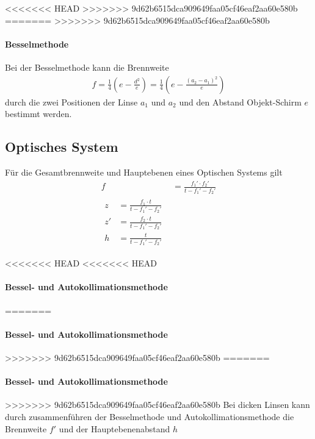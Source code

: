 \documentclass[11pt, a4paper]{article}
\begin{document}
<<<<<<< HEAD
>>>>>>> 9d62b6515dca909649faa05cf46eaf2aa60e580b
=======
>>>>>>> 9d62b6515dca909649faa05cf46eaf2aa60e580b
    \paragraph{Besselmethode}
    Bei der Besselmethode kann die Brennweite
    \begin{align}
        f = \frac{1}{4} \left( e - \frac{d^2}{e} \right) = \frac{1}{4} \left( e - \frac{\left(a_2 - a_1\right)^2}{e} \right) \label{eq:bessel}
    \end{align}
    durch die zwei Positionen der Linse $a_1$ und $a_2$ und den Abstand Objekt-Schirm $e$ bestimmt werden.
    
    \subsection{Optisches System}

    Für die Gesamtbrennweite und Hauptebenen eines Optischen Systems gilt
    \begin{align}
        f &= \frac{f_1' \cdot f_2'}{t - f_1' - f_2'} \label{eq:brenn}\\ 
        \begin{split} \label{eq:ebene}
           z &= \frac{f_1 \cdot t}{t - f_1' - f_2'}  \\
           z' &= \frac{f_2 \cdot t}{t - f_1' - f_2'} \\
           h &= \frac{t}{t - f_1' - f_2'}
        \end{split}
    \end{align}

<<<<<<< HEAD
<<<<<<< HEAD
    \paragraph*{Bessel- und Autokollimationsmethode}
=======
    \paragraph{Bessel- und Autokollimationsmethode}
>>>>>>> 9d62b6515dca909649faa05cf46eaf2aa60e580b
=======
    \paragraph{Bessel- und Autokollimationsmethode}
>>>>>>> 9d62b6515dca909649faa05cf46eaf2aa60e580b
    Bei dicken Linsen kann durch zusammenführen der Besselmethode und Autokollimationsmethode die Brennweite $f'$ und der Hauptebenenabstand $h$
    
\end{document}
